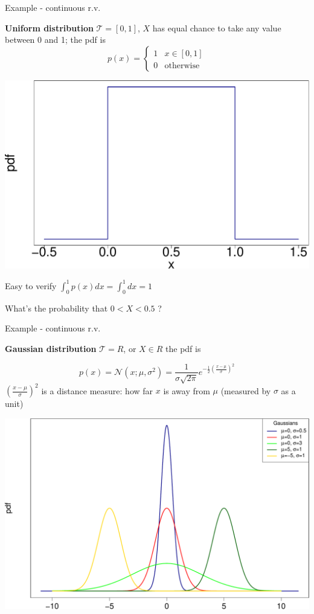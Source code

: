 \documentclass[ignorenonframetext,]{beamer}
\newcommand{\normal}[2]{\ensuremath{\mathcal{N}\left (#1,#2 \right )}}
\begin{document}
\begin{frame}{Example - continuous r.v.}
\protect\hypertarget{example---continuous-r.v.}{}

\textbf{Uniform distribution} \(\mathcal{T} = [0,1]\), \(X\) has equal
chance to take any value between 0 and 1; the pdf is
\[p(x) = \begin{cases} 1 & x\in [0,1] \\
0 & \text{otherwise} \end{cases} \]

\begin{center}\includegraphics[width=0.5\linewidth]{math4ml_files/figure-beamer/unnamed-chunk-14-1} \end{center}

Easy to verify \(\int_0^1 p(x)dx = \int_0^1 dx =1\) \bigskip

What's the probability that \(0<X<0.5\) ?

\end{frame}

\begin{frame}{Example - continuous r.v.}
\protect\hypertarget{example---continuous-r.v.-1}{}

\textbf{Gaussian distribution} \(\mathcal{T} = R\), or \(X \in R\) the
pdf is

\[p(x) = \normal{x; \mu}{\sigma^2}=\frac{1}{\sigma \sqrt{2\pi}} e^{-\frac{1}{2}(\frac{x-\mu}{\sigma})^2}\]
\((\frac{x-\mu}{\sigma})^2\) is a distance measure: how far \(x\) is
away from \(\mu\) (measured by \(\sigma\) as a unit)

\begin{center}\includegraphics[width=0.65\linewidth]{math4ml_files/figure-beamer/unnamed-chunk-15-1} \end{center}

\end{frame}
\end{document}
